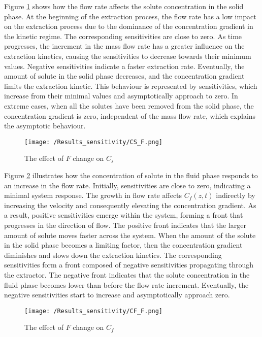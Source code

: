 \documentclass[../Article_Sensitivity_Analsysis.tex]{subfiles}
\begin{document}
   Figure \ref{fig:Sensitivty_F_CS} shows how the flow rate affects the solute concentration in the solid phase. At the beginning of the extraction process, the flow rate has a low impact on the extraction process due to the dominance of the concentration gradient in the kinetic regime. The corresponding sensitivities are close to zero. As time progresses, the increment in the mass flow rate has a greater influence on the extraction kinetics, causing the sensitivities to decrease towards their minimum values. Negative sensitivities indicate a faster extraction rate. Eventually, the amount of solute in the solid phase decreases, and the concentration gradient limits the extraction kinetic. This behaviour is represented by sensitivities, which increase from their minimal values and asymptotically approach to zero. In extreme cases, when all the solutes have been removed from the solid phase, the concentration gradient is zero, independent of the mass flow rate, which explains the asymptotic behaviour.
    
    \begin{figure}[h!]
    	\centering
    	\texttt{[image: /Results\_sensitivity/CS\_F.png]}
    	\caption{The effect of $F$ change on $C_s$}
    	\label{fig:Sensitivty_F_CS}
    \end{figure}
    
    Figure \ref{fig:Sensitivty_F_CF} illustrates how the concentration of solute in the fluid phase responds to an increase in the flow rate. Initially, sensitivities are close to zero, indicating a minimal system response. The growth in flow rate affects $C_f(z,t)$ indirectly by increasing the velocity and consequently elevating the concentration gradient. As a result, positive sensitivities emerge within the system, forming a front that progresses in the direction of flow. The positive front indicates that the larger amount of solute moves faster across the system. When the amount of the solute in the solid phase becomes a limiting factor, then the concentration gradient diminishes and slows down the extraction kinetics. The corresponding sensitivities form a front composed of negative sensitivities propagating through the extractor. The negative front indicates that the solute concentration in the fluid phase becomes lower than before the flow rate increment. Eventually, the negative sensitivities start to increase and asymptotically approach zero.
    
    \begin{figure}[h!]
    	\centering
    	\texttt{[image: /Results\_sensitivity/CF\_F.png]}
    	\caption{The effect of $F$ change on $C_f$}
    	\label{fig:Sensitivty_F_CF}
    \end{figure}
\end{document}
